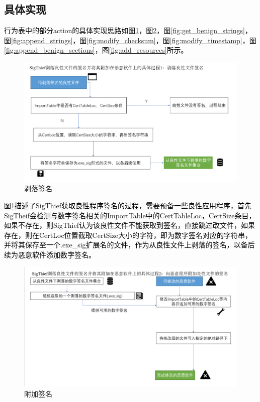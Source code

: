 \subsection{具体实现}

\textcolor{black}{行为表中的部分action的具体实现思路如图\ref{fig:peel_signature}，图\ref{fig:append_signature}，图\ref{fig:get_benign_strings}，图\ref{fig:append_strings}，图\ref{fig:modify_checksum}，图\ref{fig:modify_timestamp}，图\ref{fig:append_benign_sections}，图\ref{fig:add_resources}所示。}

\begin{figure}[htbp]
  \centering
  \includegraphics[]{images/peel_signature.png}
  \caption{剥落签名}\label{fig:peel_signature}
\end{figure}

\textcolor{black}{图\ref{fig:peel_signature}描述了SigThief获取良性程序签名的过程，需要预备一些良性应用程序，首先SigTheif会检测与数字签名相关的ImportTable中的CertTableLoc，CertSize条目，如果不存在，则SigThief认为该良性文件不能获取到签名，直接跳过改文件，如果存在，则在CertLoc位置截取CertSize大小的字符，即为数字签名对应的字符串，并将其保存至一个.exe\_sig扩展名的文件，作为从良性文件上剥落的签名，以备后续为恶意软件添加数字签名。}

\begin{figure}[htbp]
  \centering
  \includegraphics[]{images/append_signature.png}
  \caption{附加签名}\label{fig:append_signature}
\end{figure}

